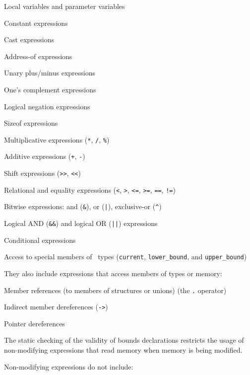 \begin{compactitem}
\item
  Local variables and parameter variables
\item
  Constant expressions
\item
  Cast expressions
\item
  Address-of expressions
\item
  Unary plus/minus expressions
\item
  One's complement expressions
\item
  Logical negation expressions
\item
  Sizeof expressions
\item
  Multiplicative expressions (\texttt{*}, \texttt{/}, \texttt{\%})
\item
  Additive expressions (\texttt{+}, \texttt{-})
\item
  Shift expressions (\texttt{>>}, \texttt{<<})
\item
  Relational and equality expressions (\texttt{<}, \texttt{>},
  \texttt{<=}, \texttt{>=}, \texttt{==}, \texttt{!=})
\item
  Bitwise expressions: and (\texttt{\&}), or (\texttt{|}), exclusive-or (\texttt{\^})
\item
  Logical AND (\texttt{\&\&}) and logical OR (\texttt{||}) expressions
\item
  Conditional expressions
\item
  Access to special members of \spanptr\ types
  (\texttt{current}, \texttt{lower\_bound}, and \texttt{upper\_bound})
\end{compactitem}

They also include expressions that access members of types or memory:

\begin{compactitem}
\item
  Member references (to members of structures or unions) (the \texttt{.}
  operator)
\item
  Indirect member dereferences (\texttt{->})
\item
  Pointer dereferences
\end{compactitem}

The static checking of the validity of bounds declarations restricts the
usage of non-modifying expressions that read memory when memory is being
modified.

Non-modifying expressions do not include:

